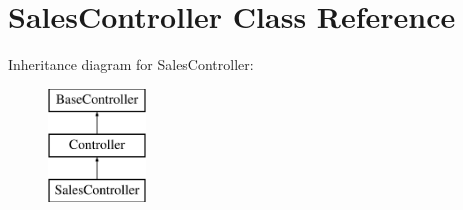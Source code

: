 \hypertarget{class_responsive_1_1_http_1_1_controllers_1_1_sales_controller}{}\section{Sales\+Controller Class Reference}
\label{class_responsive_1_1_http_1_1_controllers_1_1_sales_controller}
Inheritance diagram for Sales\+Controller\+:\begin{figure}[H]
\begin{center}
\leavevmode
\includegraphics[height=3.000000cm]{class_responsive_1_1_http_1_1_controllers_1_1_sales_controller}
\end{center}
\end{figure}

